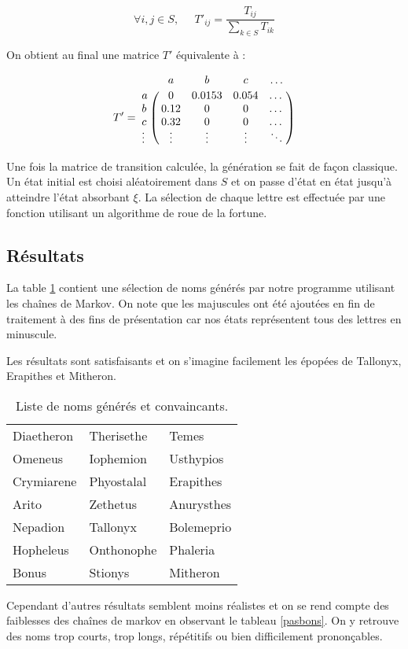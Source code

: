 \documentclass[12pt]{article}
\begin{document}
$$
\forall i, j \in S,\;\;\;\;\; {T'}_{ij} = \frac{T_{ij}}{\sum_{k \in S} T_{ik}}
$$
\vspace{0.5cm}

On obtient au final une matrice $T'$ équivalente à :

$$
T' = \bordermatrix{
    & a & b & c & \dots \cr
  a & 0 & 0.0153 & 0.054 & \dots \cr
  b & 0.12 & 0 & 0 & \dots \cr
  c & 0.32 & 0 & 0 & \dots \cr
  \vdots & \vdots & \vdots & \vdots & \ddots \cr
}
$$
\vspace{0.5cm}

Une fois la matrice de transition calculée, la génération se fait de
façon classique. Un état initial est choisi aléatoirement dans $S$ et
on passe d'état en état jusqu'à atteindre l'état absorbant $\xi$. La
sélection de chaque lettre est effectuée par une fonction utilisant un
algorithme de roue de la fortune.

\subsection{Résultats}

La table \ref{bons} contient une sélection de noms générés par notre
programme utilisant les chaînes de Markov. On note que les majuscules
ont été ajoutées en fin de traitement à des fins de présentation car
nos états représentent tous des lettres en minuscule.

Les résultats sont satisfaisants et on s'imagine facilement les
épopées de Tallonyx, Erapithes et Mitheron.

\begin{table}[H]
  \centering

  \begin{tabular}{l|l|l}
    Diaetheron & Therisethe & Temes \\
    Omeneus & Iophemion & Usthypios \\
    Crymiarene & Phyostalal & Erapithes \\
    Arito & Zethetus & Anurysthes \\
    Nepadion & Tallonyx & Bolemeprio \\
    Hopheleus & Onthonophe & Phaleria \\
    Bonus & Stionys & Mitheron
  \end{tabular}

  \caption{Liste de noms générés et convaincants.}
  \label{bons}

\end{table}

Cependant d'autres résultats semblent moins réalistes et on se rend
compte des faiblesses des chaînes de markov en observant le tableau
\ref{pasbons}. On y retrouve des noms trop courts, trop longs,
répétitifs ou bien difficilement prononçables.
\end{document}
